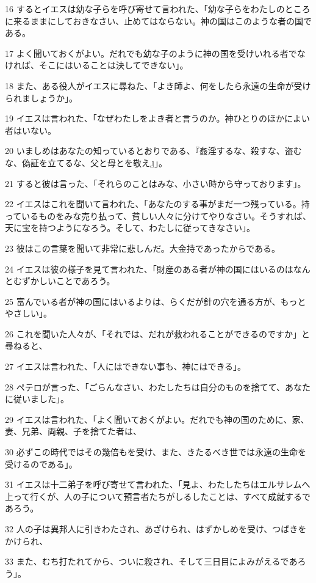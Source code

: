 \par 16 するとイエスは幼な子らを呼び寄せて言われた、「幼な子らをわたしのところに来るままにしておきなさい、止めてはならない。神の国はこのような者の国である。
\par 17 よく聞いておくがよい。だれでも幼な子のように神の国を受けいれる者でなければ、そこにはいることは決してできない」。
\par 18 また、ある役人がイエスに尋ねた、「よき師よ、何をしたら永遠の生命が受けられましょうか」。
\par 19 イエスは言われた、「なぜわたしをよき者と言うのか。神ひとりのほかによい者はいない。
\par 20 いましめはあなたの知っているとおりである、『姦淫するな、殺すな、盗むな、偽証を立てるな、父と母とを敬え』」。
\par 21 すると彼は言った、「それらのことはみな、小さい時から守っております」。
\par 22 イエスはこれを聞いて言われた、「あなたのする事がまだ一つ残っている。持っているものをみな売り払って、貧しい人々に分けてやりなさい。そうすれば、天に宝を持つようになろう。そして、わたしに従ってきなさい」。
\par 23 彼はこの言葉を聞いて非常に悲しんだ。大金持であったからである。
\par 24 イエスは彼の様子を見て言われた、「財産のある者が神の国にはいるのはなんとむずかしいことであろう。
\par 25 富んでいる者が神の国にはいるよりは、らくだが針の穴を通る方が、もっとやさしい」。
\par 26 これを聞いた人々が、「それでは、だれが救われることができるのですか」と尋ねると、
\par 27 イエスは言われた、「人にはできない事も、神にはできる」。
\par 28 ペテロが言った、「ごらんなさい、わたしたちは自分のものを捨てて、あなたに従いました」。
\par 29 イエスは言われた、「よく聞いておくがよい。だれでも神の国のために、家、妻、兄弟、両親、子を捨てた者は、
\par 30 必ずこの時代ではその幾倍もを受け、また、きたるべき世では永遠の生命を受けるのである」。
\par 31 イエスは十二弟子を呼び寄せて言われた、「見よ、わたしたちはエルサレムへ上って行くが、人の子について預言者たちがしるしたことは、すべて成就するであろう。
\par 32 人の子は異邦人に引きわたされ、あざけられ、はずかしめを受け、つばきをかけられ、
\par 33 また、むち打たれてから、ついに殺され、そして三日目によみがえるであろう」。
